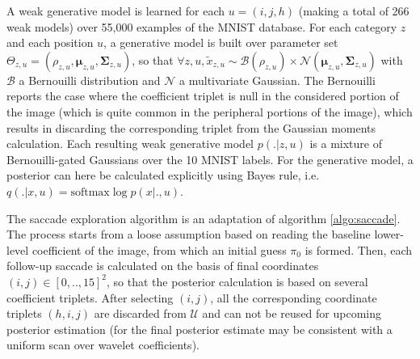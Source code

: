 \documentclass{article} %
\begin{document}
A weak generative model is learned for each $u = (i,j,h)$ (making a total of 266 weak models) over 55,000 examples of the MNIST database. For each category $z$ and each position $u$, a generative model is built over parameter set $\Theta_{z,u} = (\rho_{z,u}, \boldsymbol{\mu}_{z,u}, \boldsymbol{\Sigma}_{z,u})$, so that $\forall z,u, \tilde{x}_{z,u} \sim \mathcal{B}(\rho_{z,u}) \times \mathcal{N}(\boldsymbol{\mu}_{z,u}, \boldsymbol{\Sigma}_{z,u})$ with $\mathcal{B}$ a Bernouilli distribution and $\mathcal{N}$ a multivariate Gaussian. The Bernouilli reports the case where the coefficient triplet is null in the considered portion of the image (which is quite common in the peripheral portions of the image), which results in discarding the corresponding triplet from the Gaussian moments calculation. Each resulting weak generative model $p(.|z,u)$ is a mixture of Bernouilli-gated Gaussians over the 10 MNIST labels. For the generative model, a posterior can here be calculated explicitly using Bayes rule, i.e. $q(.|x,u) = \text{softmax} \log p(x|.,u)$.

The saccade exploration algorithm is an adaptation of algorithm \ref{algo:saccade}. The process starts from a loose assumption based on reading the baseline lower-level coefficient of the image, from which an initial guess $\pi_0$ is formed. Then, each follow-up saccade is calculated on the basis of final coordinates $(i,j) \in [0,..,15]^2$, so that the posterior calculation is based on several coefficient triplets. After selecting $(i,j)$, all the corresponding coordinate triplets $(h,i,j)$ are discarded from $\mathcal{U}$ and can not be reused for upcoming posterior estimation (for the final posterior estimate may be consistent with a uniform scan over wavelet coefficients). 
\end{document}
